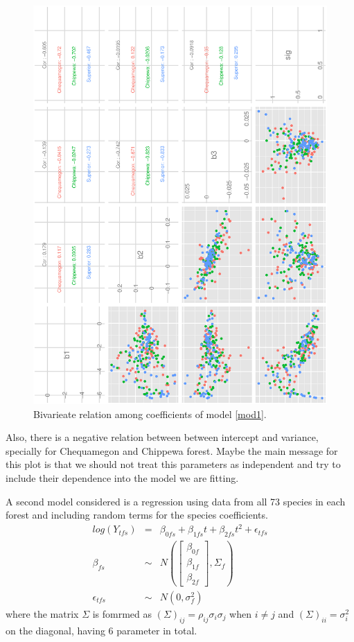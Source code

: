 \documentclass{article}
\begin{document}
\begin{figure}[h!]
\centering
\includegraphics[scale=.6, angle=-90]{scat_m1.ps}
\caption{Bivarieate relation among coefficients of model \ref{mod1}. \label{pairs1}}
\end{figure}
Also, there is a negative relation between between intercept and variance, specially for Chequamegon and Chippewa forest. Maybe the main message for this plot is that we should not treat this parameters as independent and try to include their dependence into the model we are fitting. 


A second model considered is a regression using data from all 73 species in each forest and including random terms for the species coefficients. 
\begin{eqnarray}
\nonumber log(Y_{tfs}) &=&  \beta_{0fs} + \beta_{1fs}t + \beta_{2fs}t^2 + \epsilon_{tfs}  \\
\beta_{fs} &\sim& N \left( \left[ \begin{array}{c}
    \beta_{0f}   \\ 
    \beta_{1f}  \\ 
    \beta_{2f}  
\end{array} \right],   \Sigma_f \right) \\ 
\epsilon_{tfs} &\sim& N(0,\sigma_f^2)
\label{mod2}
\end{eqnarray}
where the matrix $\Sigma$ is fomrmed as $(\Sigma)_{ij}=\rho_{ij}\sigma_i\sigma_j$ when $i\neq j$ and $(\Sigma)_{ii}=\sigma_i^2$ on the diagonal, having 6 parameter in total.     
\end{document}
